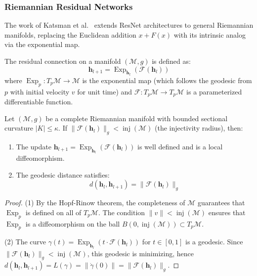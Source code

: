 \subsubsection{Riemannian Residual Networks}

The work of Katsman et al.~\citep{katsman2023riemannian} extends ResNet architectures to general Riemannian manifolds, replacing the Euclidean addition $x + F(x)$ with its intrinsic analog via the exponential map.

\begin{definition}\label{def:residual_riemanniano}
The residual connection on a manifold $(\mathcal{M}, g)$ is defined as:
\begin{equation}
\mathbf{h}_{l+1} = \operatorname{Exp}_{\mathbf{h}_l}(\mathcal{F}(\mathbf{h}_l))
\end{equation}
where $\operatorname{Exp}_p: T_p\mathcal{M} \to \mathcal{M}$ is the exponential map (which follows the geodesic from $p$ with initial velocity $v$ for unit time) and $\mathcal{F}: T_p\mathcal{M} \to T_p\mathcal{M}$ is a parameterized differentiable function.
\end{definition}

\begin{proposition}\label{prop:estabilidad_residual_riemanniano}
Let $(\mathcal{M}, g)$ be a complete Riemannian manifold with bounded sectional curvature $|K| \leq \kappa$. If $\|\mathcal{F}(\mathbf{h}_l)\|_g < \operatorname{inj}(\mathcal{M})$ (the injectivity radius), then:
\begin{enumerate}
    \item The update $\mathbf{h}_{l+1} = \operatorname{Exp}_{\mathbf{h}_l}(\mathcal{F}(\mathbf{h}_l))$ is well defined and is a local diffeomorphism.
    \item The geodesic distance satisfies:
    \begin{equation}
    d(\mathbf{h}_l, \mathbf{h}_{l+1}) = \|\mathcal{F}(\mathbf{h}_l)\|_g
    \end{equation}
\end{enumerate}
\end{proposition}

\begin{proof}
(1) By the Hopf-Rinow theorem, the completeness of $\mathcal{M}$ guarantees that $\operatorname{Exp}_p$ is defined on all of $T_p\mathcal{M}$. The condition $\|v\| < \operatorname{inj}(\mathcal{M})$ ensures that $\operatorname{Exp}_p$ is a diffeomorphism on the ball $B(0, \operatorname{inj}(\mathcal{M})) \subset T_p\mathcal{M}$.

(2) The curve $\gamma(t) = \operatorname{Exp}_{\mathbf{h}_l}(t \cdot \mathcal{F}(\mathbf{h}_l))$ for $t \in [0,1]$ is a geodesic. Since $\|\mathcal{F}(\mathbf{h}_l)\|_g < \operatorname{inj}(\mathcal{M})$, this geodesic is minimizing, hence $d(\mathbf{h}_l, \mathbf{h}_{l+1}) = L(\gamma) = \|\dot{\gamma}(0)\| = \|\mathcal{F}(\mathbf{h}_l)\|_g$.
\end{proof}

